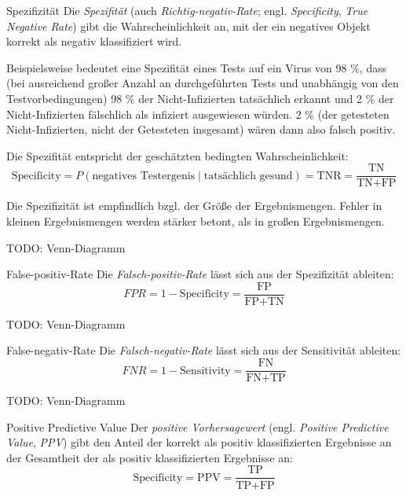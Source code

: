 \begin{defi}[Überlappungsmetrik]{Spezifizität}
    Die \emph{Spezifität} (auch \emph{Richtig-negativ-Rate}; engl. \emph{Specificity}, \emph{True Negative Rate}) gibt die Wahrscheinlichkeit an, mit der ein negatives Objekt korrekt als negativ klassifiziert wird.


    Beispielsweise bedeutet eine Spezifität eines Tests auf ein Virus von 98 \%, dass (bei ausreichend großer Anzahl an durchgeführten Tests und unabhängig von den Testvorbedingungen) 98 \% der Nicht-Infizierten tatsächlich erkannt und 2 \% der Nicht-Infizierten fälschlich als infiziert ausgewiesen würden.
    2 \% (der getesteten Nicht-Infizierten, nicht der Getesteten insgesamt) wären dann also falsch positiv.

    Die Spezifität entspricht der geschätzten bedingten Wahrscheinlichkeit:
    \[
        \text{Specificity} = P(\text{negatives Testergenis} \mid \text{tatsächlich gesund}) = \text{TNR} = \frac{\text{TN}}{\text{TN} + \text{FP}}
    \]

    Die Spezifizität ist empfindlich bzgl. der Größe der Ergebnismengen.
    Fehler in kleinen Ergebnismengen werden stärker betont, als in großen Ergebnismengen.

    TODO: Venn-Diagramm
\end{defi}

\begin{bonus}[Überlappungsmetrik]{False-positiv-Rate}
    Die \emph{Falsch-positiv-Rate} lässt sich aus der Spezifizität ableiten:
    \[
        FPR = 1 - \text{Specificity} = \frac{\text{FP}}{\text{FP} + \text{TN}}
    \]

    TODO: Venn-Diagramm
\end{bonus}

\begin{bonus}[Überlappungsmetrik]{False-negativ-Rate}
    Die \emph{Falsch-negativ-Rate} lässt sich aus der Sensitivität ableiten:
    \[
        FNR = 1 - \text{Sensitivity} = \frac{\text{FN}}{\text{FN} + \text{TP}}
    \]

    TODO: Venn-Diagramm
\end{bonus}

\begin{defi}[Überlappungsmetrik]{Positive Predictive Value}
    Der \emph{positive Vorhersagewert} (engl. \emph{Positive Predictive Value}, \emph{PPV}) gibt den Anteil der korrekt als positiv klassifizierten Ergebnisse an der Gesamtheit der als positiv klassifizierten Ergebnisse an:
    \[
        \text{Specificity} = \text{PPV} = \frac{\text{TP}}{\text{TP} + \text{FP}}
    \]
\end{defi}

